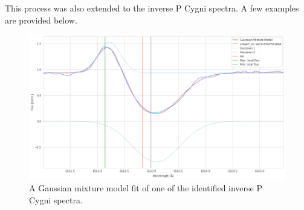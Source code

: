 This process was also extended to the inverse P Cygni spectra. A few examples are provided below. 

\begin{figure}[h]
\centering
\includegraphics[scale=0.45]{figures/inverse p cygni 1.png}
\caption{A Gaussian mixture model fit of one of the identified inverse P Cygni spectra. }
\end{figure}











